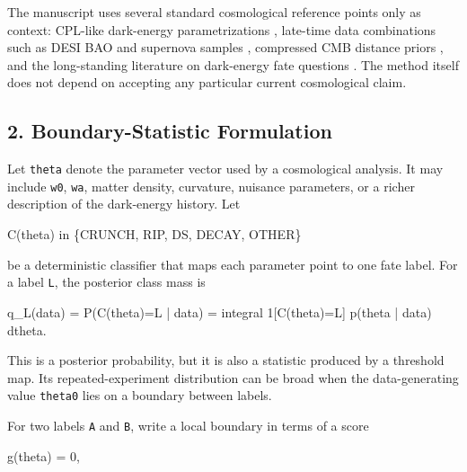 \documentclass[
]{article}
\newenvironment{Shaded}{}{}
\newcommand{\NormalTok}[1]{#1}
\begin{document}
The manuscript uses several standard cosmological reference points only
as context: CPL-like dark-energy parametrizations
\citep{ChevallierPolarski2001, Linder2003}, late-time data combinations
such as DESI BAO and supernova samples \citep{DESIDR2, Brout2022},
compressed CMB distance priors \citep{ChenHuangWang2018}, and the
long-standing literature on dark-energy fate questions
\citep{Dyson1979, KraussTurner1999, KraussStarkman2000, Caldwell2003}.
The method itself does not depend on accepting any particular current
cosmological claim.

\subsection{2. Boundary-Statistic
Formulation}\label{boundary-statistic-formulation}

Let \texttt{theta} denote the parameter vector used by a cosmological
analysis. It may include \texttt{w0}, \texttt{wa}, matter density,
curvature, nuisance parameters, or a richer description of the
dark-energy history. Let

\begin{Shaded}
\begin{Highlighting}[]
\NormalTok{C(theta) in \{CRUNCH, RIP, DS, DECAY, OTHER\}}
\end{Highlighting}
\end{Shaded}

be a deterministic classifier that maps each parameter point to one fate
label. For a label \texttt{L}, the posterior class mass is

\begin{Shaded}
\begin{Highlighting}[]
\NormalTok{q\_L(data) = P(C(theta)=L | data)}
\NormalTok{          = integral 1[C(theta)=L] p(theta | data) dtheta.}
\end{Highlighting}
\end{Shaded}

This is a posterior probability, but it is also a statistic produced by
a threshold map. Its repeated-experiment distribution can be broad when
the data-generating value \texttt{theta0} lies on a boundary between
labels.

For two labels \texttt{A} and \texttt{B}, write a local boundary in
terms of a score

\begin{Shaded}
\begin{Highlighting}[]
\NormalTok{g(theta) = 0,}
\end{Highlighting}
\end{Shaded}
\end{document}
